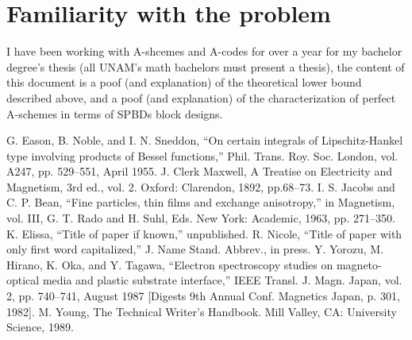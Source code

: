 \documentclass[conference]{IEEEtran}
\begin{document}

%
%
\section{Familiarity with the problem}
I have been working with A-shcemes and A-codes for over a year for my bachelor degree's thesis (all UNAM's math bachelors must present a thesis), the content of this document is a poof (and explanation) of the theoretical lower bound described above, and a poof (and explanation) of the characterization of perfect A-schemes in terms of SPBDs block designs.

%
%
\newpage
\begin{thebibliography}{00}
     G. Eason, B. Noble, and I. N. Sneddon, ``On certain integrals of Lipschitz-Hankel type involving products of Bessel functions,'' Phil. Trans. Roy. Soc. London, vol. A247, pp. 529--551, April 1955.
     J. Clerk Maxwell, A Treatise on Electricity and Magnetism, 3rd ed., vol. 2. Oxford: Clarendon, 1892, pp.68--73.
     I. S. Jacobs and C. P. Bean, ``Fine particles, thin films and exchange anisotropy,'' in Magnetism, vol. III, G. T. Rado and H. Suhl, Eds. New York: Academic, 1963, pp. 271--350.
     K. Elissa, ``Title of paper if known,'' unpublished.
     R. Nicole, ``Title of paper with only first word capitalized,'' J. Name Stand. Abbrev., in press.
     Y. Yorozu, M. Hirano, K. Oka, and Y. Tagawa, ``Electron spectroscopy studies on magneto-optical media and plastic substrate interface,'' IEEE Transl. J. Magn. Japan, vol. 2, pp. 740--741, August 1987 [Digests 9th Annual Conf. Magnetics Japan, p. 301, 1982].
     M. Young, The Technical Writer's Handbook. Mill Valley, CA: University Science, 1989.
\end{thebibliography}
\end{document}

